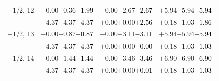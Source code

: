 \documentclass[compress]{beamer}
\begin{document}
\begin{frame}
\begin{tabular}{r | c | c | c}
$-$1/2, 12 & $-0.00$\hspace{0.1 cm}$-0.36$\hspace{0.1 cm}\textcolor{black}{$-1.99$} & $-0.00$\hspace{0.1 cm}$-2.67$\hspace{0.1 cm}\textcolor{black}{$-2.67$} & $+5.94$\hspace{0.1 cm}$+5.94$\hspace{0.1 cm}\textcolor{black}{$+5.94$} \\
           & $-4.37$\hspace{0.1 cm}$-4.37$\hspace{0.1 cm}\textcolor{black}{$-4.37$} & $+0.00$\hspace{0.1 cm}$+0.00$\hspace{0.1 cm}\textcolor{black}{$+2.56$} & $+0.18$\hspace{0.1 cm}$+1.03$\hspace{0.1 cm}\textcolor{black}{$-1.86$} \\
$-$1/2, 13 & $-0.00$\hspace{0.1 cm}$-0.87$\hspace{0.1 cm}\textcolor{black}{$-0.87$} & $-0.00$\hspace{0.1 cm}$-3.11$\hspace{0.1 cm}\textcolor{black}{$-3.11$} & $+5.94$\hspace{0.1 cm}$+5.94$\hspace{0.1 cm}\textcolor{black}{$+5.94$} \\
           & $-4.37$\hspace{0.1 cm}$-4.37$\hspace{0.1 cm}\textcolor{black}{$-4.37$} & $+0.00$\hspace{0.1 cm}$+0.00$\hspace{0.1 cm}\textcolor{black}{$-0.00$} & $+0.18$\hspace{0.1 cm}$+1.03$\hspace{0.1 cm}\textcolor{black}{$+1.03$} \\
$-$1/2, 14 & $-0.00$\hspace{0.1 cm}$-1.44$\hspace{0.1 cm}\textcolor{black}{$-1.44$} & $-0.00$\hspace{0.1 cm}$-3.46$\hspace{0.1 cm}\textcolor{black}{$-3.46$} & $+6.90$\hspace{0.1 cm}$+6.90$\hspace{0.1 cm}\textcolor{black}{$+6.90$} \\
           & $-4.37$\hspace{0.1 cm}$-4.37$\hspace{0.1 cm}\textcolor{black}{$-4.37$} & $+0.00$\hspace{0.1 cm}$+0.00$\hspace{0.1 cm}\textcolor{black}{$+0.01$} & $+0.18$\hspace{0.1 cm}$+1.03$\hspace{0.1 cm}\textcolor{black}{$+1.03$} \\

\end{tabular}
\end{frame}
\end{document}
